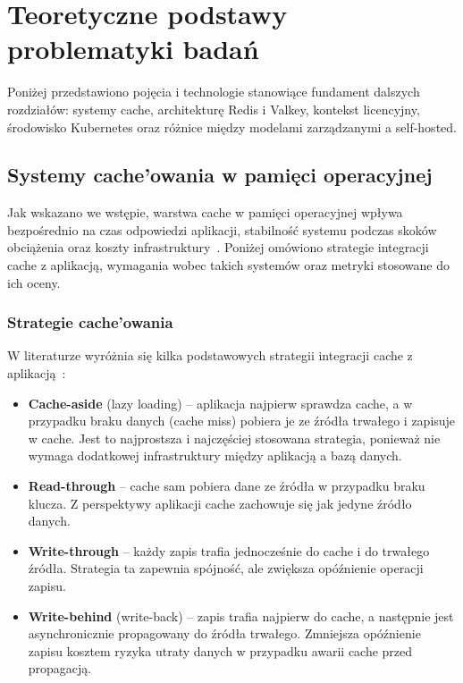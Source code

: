 \chapter{Teoretyczne podstawy problematyki badań}\label{ch:tematyka}

Poniżej przedstawiono pojęcia i technologie stanowiące fundament dalszych rozdziałów: systemy cache, architekturę Redis i Valkey, kontekst licencyjny, środowisko Kubernetes oraz różnice między modelami zarządzanymi a self-hosted.

\section{Systemy cache'owania w pamięci operacyjnej}

Jak wskazano we wstępie, warstwa cache w pamięci operacyjnej wpływa bezpośrednio na czas odpowiedzi aplikacji, stabilność systemu podczas skoków obciążenia oraz koszty infrastruktury~\cite{kaptosv2025}. Poniżej omówiono strategie integracji cache z aplikacją, wymagania wobec takich systemów oraz metryki stosowane do ich oceny.

\subsection{Strategie cache'owania}

W literaturze wyróżnia się kilka podstawowych strategii integracji cache z aplikacją~\cite{azureCacheAside, zakhary2017caching}:

\begin{itemize}
    \item \textbf{Cache-aside} (lazy loading) -- aplikacja najpierw sprawdza cache, a w przypadku braku danych (cache miss) pobiera je ze źródła trwałego i zapisuje w cache. Jest to najprostsza i najczęściej stosowana strategia, ponieważ nie wymaga dodatkowej infrastruktury między aplikacją a bazą danych.
    \item \textbf{Read-through} -- cache sam pobiera dane ze źródła w przypadku braku klucza. Z perspektywy aplikacji cache zachowuje się jak jedyne źródło danych.
    \item \textbf{Write-through} -- każdy zapis trafia jednocześnie do cache i do trwałego źródła. Strategia ta zapewnia spójność, ale zwiększa opóźnienie operacji zapisu.
    \item \textbf{Write-behind} (write-back) -- zapis trafia najpierw do cache, a następnie jest asynchronicznie propagowany do źródła trwałego. Zmniejsza opóźnienie zapisu kosztem ryzyka utraty danych w przypadku awarii cache przed propagacją.
\end{itemize}

